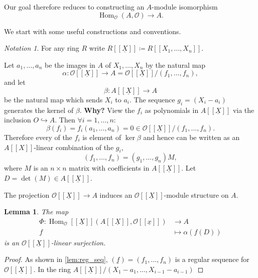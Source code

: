 \documentclass{article}
\theoremstyle{plain}%
\newtheorem{lemma}{Lemma}[section]
\theoremstyle{definition}
\theoremstyle{remark}
\newtheorem*{notation}{Notation}
\renewcommand{\hom}{\operatorname{Hom}}
\begin{document}
    Our goal therefore reduces to constructing an \(A\)-module isomorphism
    \[
        \hom_\mathcal{O}(A, \mathcal{O}) \to A.
    \]

    We start with some useful constructions and conventions.
    \begin{notation}
        For any ring \(R\) write \(R[[\underline{X}]] \coloneqq R[[X_1, \dots, X_n]]\).
    \end{notation}

    Let \(a_1, \dots, a_n\) be the images in \(A\) of \(X_1, \dots, X_n\) by the natural map
    \[
        \alpha \colon \mathcal{O}[[\underline{X}]] \to A = \mathcal{O}[[\underline{X}]]/(f_1, \dots, f_n),
    \]
    and let
    \[
        \beta \colon A[[\underline{X}]] \to A  
    \]
    be the natural map which sends \(X_i\) to \(a_i\). The sequence \(g_i =  (X_i - a_i)\) 
    generates the kernel of \(\beta\). \textbf{Why?}
    View the \(f_i\) as polynomials in \(A[[\underline{X}]]\) via the inclusion \(O \hookrightarrow A\). Then \(\forall i = 1, \dots, n\colon\)
    \[
        \beta(f_i) = f_i(a_1, \dots, a_n) = 0 \in \mathcal{O}[[\underline{X}]]/(f_1, \dots, f_n).
    \]
    Therefore every of the \(f_i\) is element of \(\ker \beta\) and hence can be written as 
    an \(A[[X]]\)-linear combination of the \(g_i\),
    \[
        (f_1, \dots, f_n) = (g_1, \dots, g_n)M,  
    \]
    where \(M\) is an \(n \times n\) matrix with coefficients in \(A[[\underline{X}]]\). 
    Let \(D = \det(M) \in A[[\underline{X}]]\).
    

    The projection \(\mathcal{O}[[\underline{X}]] \to A\) induces an \(\mathcal{O}[[\underline{X}]]\)-module 
    structure on \(A\).

    \begin{lemma}
        The map
        \begin{align*}
            \Phi\colon \hom_\mathcal{O}[[\underline{X}]](A[[\underline{X}]], \mathcal{O}[[\underline{x}]]) &\to A\\
            f &\mapsto \alpha(f(D))
        \end{align*}
        is an \(\mathcal{O}[[\underline{X}]]\)-linear surjection.
    \end{lemma}
    \begin{proof}
        As shown in \cref{lem:reg_seq}, \((\underline{f}) = (f_1, \dots, f_n)\) 
        is a regular sequence for \(\mathcal{O}[[\underline{X}]]\).
        In the ring \(A[[\underline{X}]]/(X_1 - a_1, \dots, X_{i-1} - a_{i-1})\)
    \end{proof}
\end{document}
